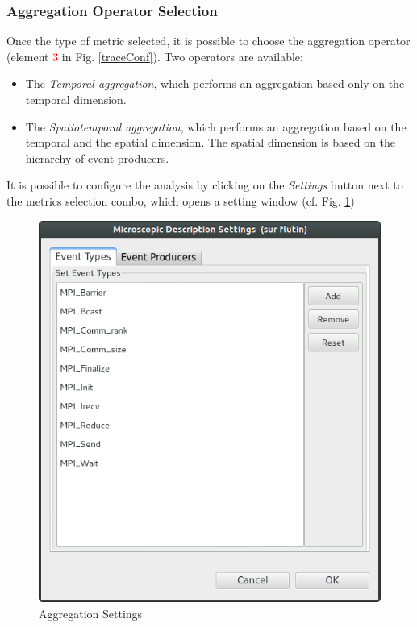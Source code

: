 \documentclass[twoside]{article}
\begin{document}
\begin{sloppypar}
\subsubsection{Aggregation Operator Selection}
Once the type of metric selected, it is possible to choose the aggregation operator (element \textcolor{red}{3} in Fig. \ref{traceConf}). Two operators are available:
\begin{itemize}
	\item The \textit{Temporal aggregation}, which performs an aggregation based only on the temporal dimension.
	\item The \textit{Spatiotemporal aggregation}, which performs an aggregation based on the temporal and the spatial dimension. The spatial dimension is based on the hierarchy of event producers.
\end{itemize}

It is possible to configure the analysis by clicking on the \textit{Settings} button next to the metrics selection combo, which opens a setting window (cf. Fig. \ref{microSettings})

\begin{figure}[h!]
	\centering
	\includegraphics[scale=0.4]{images/state_settings.png}
	\caption{Aggregation Settings}
	\label{microSettings}
\end{figure}


\end{sloppypar}
\end{document}
